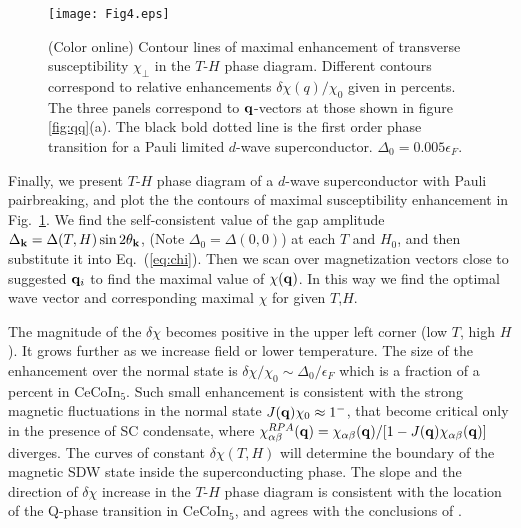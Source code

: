 \documentclass[aps,prl,twocolumn,showpacs,amsmath,amssymb]{revtex4-1}
\newcommand{\cecoin}{CeCoIn$_5$}
\begin{document}


\begin{figure}[t]
\texttt{[image: Fig4.eps]}
\caption{ 
	\label{fig:ph.d} 
	(Color online) 
	Contour lines of maximal enhancement of transverse susceptibility $\chi_\perp$ in the $T$-$H$ 
	phase diagram. Different contours correspond to relative enhancements 
	$\delta\chi(q)/\chi_0$ given in percents. 
	The three panels correspond to ${\bf q}$-vectors at those shown in figure \ref{fig:qq}(a). 
	The black bold dotted line is the first order phase transition
	for a Pauli limited $d$-wave superconductor. $\Delta_0 = 0.005\epsilon_F$.
}
\end{figure}
 
%
Finally, we present $T$-$H$ phase diagram of a $d$-wave superconductor with Pauli pairbreaking, 
and plot the the contours of maximal susceptibility enhancement in Fig.~\ref{fig:ph.d}. 
We find the self-consistent value of the 
gap amplitude $\Delta_{\bf k} = \Delta(T,H) \sin2\theta_{\bf k}$, (Note $\Delta_0 = \Delta(0,0)$) 
at each $T$ and $H_0$, and then substitute it into Eq.~(\ref{eq:chi}). 
Then we scan over magnetization vectors close to suggested ${\bf q}_i$ to find the maximal value of 
$\chi({\bf q})$. In this way we find the optimal wave vector and corresponding maximal $\chi$ for 
given $T$,$H$. 

The magnitude of the $\delta \chi$ becomes positive in the 
upper left corner (low $T$, high $H$). It grows further as we increase field or  
lower temperature. The size of the enhancement over the normal state is 
$\delta\chi/\chi_0 \sim \Delta_0/\epsilon_F$ which is a fraction of a percent in \cecoin. 
Such small enhancement is consistent with the strong magnetic fluctuations in the normal 
state $J({\bf q}) \chi_0 \approx 1^-$, that become critical only in the presence of SC condensate, where 
$\chi^{RPA}_{\alpha\beta}({\bf q})={\chi_{\alpha\beta} ({\bf q}) }/{[1-J({\bf q}) \chi_{\alpha\beta}({\bf q})]}$
diverges. 
The curves of constant 
$\delta\chi(T,H)$ will determine the boundary of the magnetic SDW 
state inside the superconducting phase. 
The slope and the direction of $\delta\chi$ increase in the $T$-$H$ phase diagram is consistent with 
the location of the Q-phase transition in \cecoin, and agrees with the conclusions of 
\cite{kato11_sc_afm}. 
\end{document}
